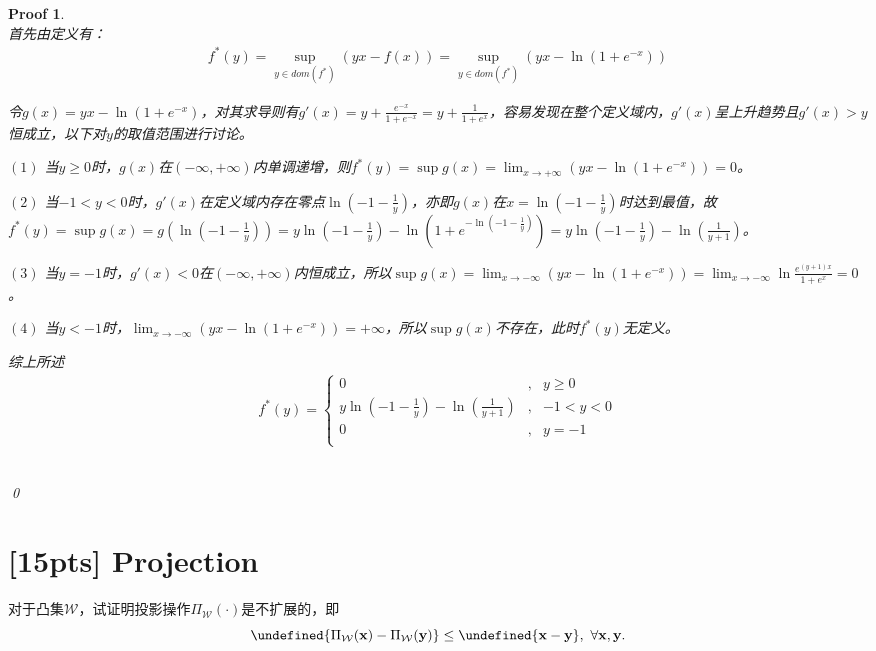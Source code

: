 \documentclass[a4paper,UTF8]{article}
\let\norm\undefined %
\DeclarePairedDelimiter\norm{\lVert}{\rVert}
\numberwithin{equation}{section}
\newtheorem*{myProof}{Proof}
\begin{document}
\begin{myProof}~\\

首先由定义有：
\begin{eqnarray*}
	f^*(y) = \sup_{y \in dom(f^*)} (yx - f(x)) = \sup_{y \in dom(f^*)} (yx - \ln(1 + e^{-x}))
\end{eqnarray*}

令$g(x) = yx - \ln(1 + e^{-x})$，对其求导则有$g'(x) = y + \frac{e^{-x}}{1 + e^{-x}} = y + \frac{1}{1 + e^x}$，容易发现在整个定义域内，$g'(x)$呈上升趋势且$g'(x) > y$恒成立，以下对$y$的取值范围进行讨论。

$(1)$ 当$y \ge 0$时，$g(x)$在$(-\infty, +\infty)$内单调递增，则$f^*(y) = \sup g(x) = \lim_{x \rightarrow +\infty} (yx - \ln(1 + e^{-x})) = 0$。

$(2)$ 当$-1 < y < 0$时，$g'(x)$在定义域内存在零点$\ln(-1 - \frac{1}{y})$，亦即$g(x)$在$x=\ln(-1 - \frac{1}{y})$时达到最值，故$f^*(y) = \sup g(x) = g(\ln(-1 - \frac{1}{y})) = y \ln(-1 - \frac{1}{y}) - \ln \left( 1 + e^{-\ln(-1 - \frac{1}{y})} \right) = y \ln(-1 - \frac{1}{y}) - \ln \left( \frac{1}{y+1} \right)$。

$(3)$ 当$y = -1$时，$g'(x) < 0$在$(-\infty, +\infty)$内恒成立，所以$\sup g(x) = \lim_{x \rightarrow -\infty} ( yx - \ln(1 + e^{-x}) ) = \lim_{x \rightarrow -\infty} \ln \frac{e^{(y+1)x}}{1+e^x} = 0$。

$(4)$ 当$y < -1$时，$\lim_{x \rightarrow -\infty} ( yx - \ln(1 + e^{-x}) ) = +\infty$，所以$\sup g(x)$不存在，此时$f^*(y)$无定义。

综上所述
\begin{eqnarray*}
f^*(y) = \left\{
\begin{aligned}
	0 &,& y \ge 0 \\
	y \ln(-1 - \frac{1}{y}) - \ln \left( \frac{1}{y+1} \right) &,& -1 < y < 0 \\
	0 &,& y = -1 \\
\end{aligned}
\right.
\end{eqnarray*}

	~\\	
	\qed
\end{myProof}

\newpage
\section{[15pts] Projection}
\noindent 对于凸集$\mathcal{W}$，试证明投影操作$\Pi_{\mathcal{W}}(\cdot)$是不扩展的，即
\[
\norm{\Pi_{\mathcal{W}}(\mathbf{x})-\Pi_{\mathcal{W}}(\mathbf{y})} \leq \norm{\mathbf{x} - \mathbf{y}}, \ \forall \mathbf{x}, \mathbf{y}.
\]
\end{document}
